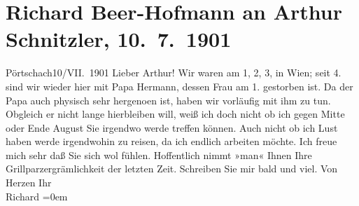 

         
         \renewcommand{\erwaehntePersonen}{Personen: Hermann Beer, Rosa Beer, Franz Grillparzer}
         \renewcommand{\erwaehnteOrte}{Orte: Pörtschach, Wien}
         \renewcommand{\erwaehnteWerke}{}
               \section[Richard Beer-Hofmann an Arthur Schnitzler, 10. 7. 1901]{ Richard Beer-Hofmann an Arthur Schnitzler,
               10. 7. 1901}\nopagebreak{}\rehead{ }\begin{ledgroupsized}[t]{13cm}\normalsize\beginnumbering \toendnotes[C]{\smallbreak\pagebreak[2]} 
\toendnotes[C]{\smallbreak}\pstart
           \raggedleft{}{\pb}Pörtschach10/VII. 1901\pend
           \pstart
           Lieber Arthur! Wir waren am 1, 2,
                  3, in Wien; seit 4. sind
               wir wieder hier mit Papa Hermann, dessen Frau am 1.
               gestorben ist. Da der Papa auch
               physisch sehr hergeno{\geminationm}en ist, haben wir vorläufig mit
               ihm zu tun. Obgleich er nicht lange hierbleiben will, weiß ich doch nicht ob ich
               gegen Mitte oder Ende August Sie irgendwo werde treffen
               können.\pend
           \pstart
           {\pb}Auch nicht ob ich Lust haben werde
               irgendwohin zu reisen, da ich endlich arbeiten möchte. Ich freue mich sehr daß Sie
               sich wol fühlen. Hoffentlich nimmt »man« Ihnen Ihre Grillparzergrämlichkeit der letzten Zeit. Schreiben Sie mir bald und
               viel.\pend
           \pstart
           Von Herzen Ihr{\\[\baselineskip]}\spacefill\mbox{Richard}\pend
           \leftskip=0em{}
         
         \endnumbering{}\end{ledgroupsized}  \newcommand{\dateiname}{L01144}\newcommand{\titel}{Richard Beer-Hofmann an Arthur Schnitzler, 10. 7. 1901}\newcommand{\editorInnen}{Martin Anton Müller und Gerd-Hermann Susen}
      